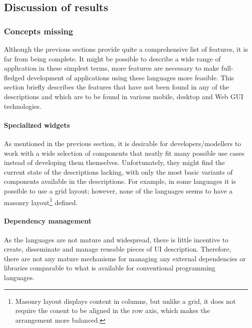 \subsection{Discussion of results}\label{subsec:evaluation-discussion-of-results}

\subsubsection{Concepts missing}


Although the previous sections provide quite a comprehensive list of features, it is far from being complete.
It might be possible to describe a wide range of application in these simplest terms, more features are necessary to make full-fledged development of applications using these languages more feasible.
This section briefly describes the features that have not been found in any of the descriptions and which are to be found in various mobile, desktop and Web GUI technologies.

\paragraph{Specialized widgets}
As mentioned in the previous section, it is desirable for developers/modellers to work with a wide selection of components that neatly fit many possible use cases instead of developing them themselves.
Unfortunately, they might find the current state of the descriptions lacking, with only the most basic variants of components available in the descriptions.
For example, in some languages it is possible to use a grid layout;
however, none of the languages seems to have a masonry layout\footnote{Masonry layout displays content in columns, but unlike a grid, it does not require the conent to be aligned in the row axis, which makes the arrangement more balanced.} defined.



\paragraph{Dependency management}
As the languages are not mature and widespread, there is little incentive to create, disseminate and manage reusable pieces of UI description.
Therefore, there are not any mature mechanisms for managing any external dependencies or libraries comparable to what is available for conventional programming languages.

